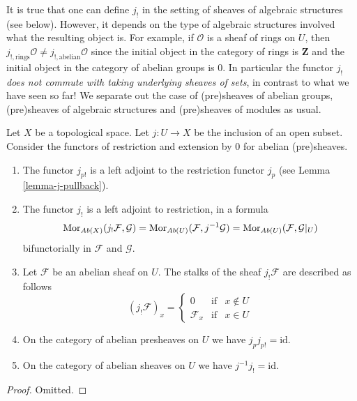 \noindent
It is true that one can define $j_!$ in the setting of sheaves
of algebraic structures (see below). However, it depends on the
type of algebraic structures involved what the resulting
object is. For example, if $\mathcal{O}$ is a sheaf of rings
on $U$, then $j_{!, \mathrm{rings}}\mathcal{O} \not = j_{!, \mathrm{abelian}}\mathcal{O}$
since the initial object in the category of rings
is $\mathbf{Z}$ and the initial object in the category
of abelian groups is $0$. In particular the functor $j_!$
{\it does not commute with taking underlying sheaves of sets},
in contrast to what we have seen so far! We separate out the case
of (pre)sheaves of abelian groups, (pre)sheaves of algebraic structures
and (pre)sheaves of modules as usual.

\begin{lemma}
\label{lemma-j-shriek-abelian}
Let $X$ be a topological space.
Let $j : U \to X$ be the inclusion of an open subset.
Consider the functors of restriction and extension
by $0$ for abelian (pre)sheaves.
\begin{enumerate}
\item The functor $j_{p!}$ is a left adjoint to the
restriction functor $j_p$ (see Lemma \ref{lemma-j-pullback}).
\item The functor $j_!$ is a left adjoint to restriction,
in a formula
$$
\mathop{\mathrm{Mor}}\nolimits_{\textit{Ab}(X)}(j_!\mathcal{F}, \mathcal{G})
=
\mathop{\mathrm{Mor}}\nolimits_{\textit{Ab}(U)}(\mathcal{F}, j^{-1}\mathcal{G})
=
\mathop{\mathrm{Mor}}\nolimits_{\textit{Ab}(U)}(\mathcal{F}, \mathcal{G}|_U)
$$
bifunctorially in $\mathcal{F}$ and $\mathcal{G}$.
\item Let $\mathcal{F}$ be an abelian sheaf on $U$.
The stalks of the sheaf $j_!\mathcal{F}$ are described
as follows
$$
(j_{!}\mathcal{F})_x =
\left\{
\begin{matrix}
0 & \text{if} & x \not \in U \\
\mathcal{F}_x & \text{if} & x \in U
\end{matrix}
\right.
$$
\item On the category of abelian presheaves on $U$
we have $j_pj_{p!} = \text{id}$.
\item On the category of abelian sheaves on $U$
we have $j^{-1}j_! = \text{id}$.
\end{enumerate}
\end{lemma}

\begin{proof}
Omitted.
\end{proof}

